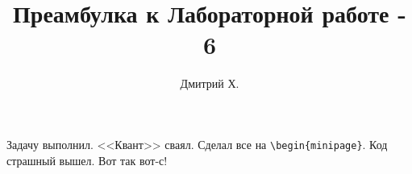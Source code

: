 \documentclass[10dd, a5paper]{article}
\title{Преамбулка к Лабораторной работе - 6}
\author{Дмитрий Х.}
\begin{document}
\maketitle
Задачу выполнил. <<Квант>> сваял. Сделал все на \verb|\begin{minipage}|. Код страшный вышел. Вот так вот-с!
\newpage

\newpage

\end{document}
